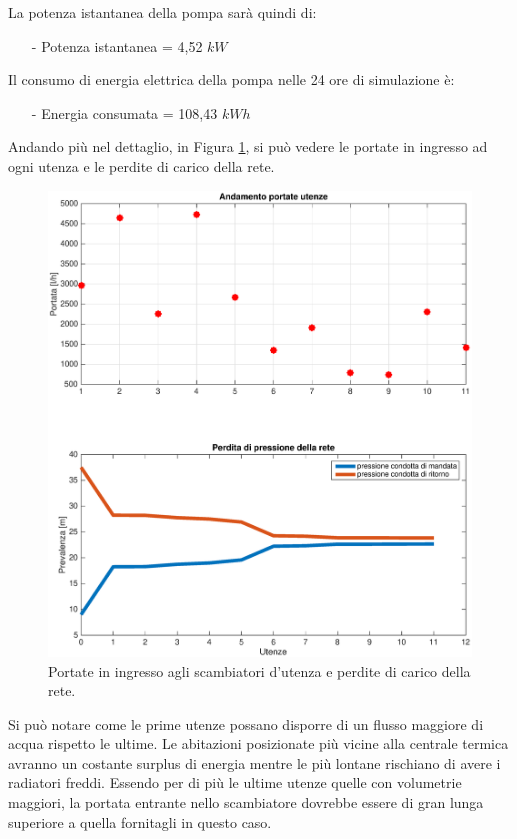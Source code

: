 \documentclass[laurea,oneside,11pt]{USiena_tesiLM}
\begin{document}
La potenza istantanea della pompa sarà quindi di:
\begin{itemize}
\item[-] Potenza istantanea = 4,52 $kW$
\end{itemize}
Il consumo di energia elettrica della pompa nelle 24 ore di simulazione è:
\begin{itemize}
\item[-] Energia consumata = 108,43 $kWh$
\end{itemize}

Andando più nel dettaglio, in Figura \ref{fig:sim2_noreg}, si può vedere le portate in ingresso ad ogni utenza e le perdite di carico della rete. 

\begin{figure}[!ht]
\centering
\includegraphics[width=\textwidth]{figure/sim2_noreg} 
\caption{Portate in ingresso agli scambiatori d'utenza e perdite di carico della rete. }
\label{fig:sim2_noreg}
\end{figure}

Si può notare come le prime utenze possano disporre di un flusso maggiore di acqua rispetto le ultime. Le abitazioni posizionate più vicine alla centrale termica avranno un costante surplus di energia mentre le più lontane rischiano di avere i radiatori freddi. Essendo per di più le ultime utenze quelle con volumetrie maggiori, la portata entrante nello scambiatore dovrebbe essere di gran lunga superiore a quella fornitagli in questo caso. 
\end{document}
